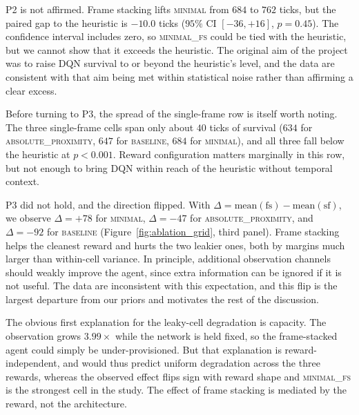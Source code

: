 \documentclass[12pt,a4paper,titlepage]{article}
\begin{document}
P2 is not affirmed. Frame stacking lifts \textsc{minimal} from $684$ to $762$ ticks, but the paired gap to the heuristic is $-10.0$ ticks ($95\%$ CI $[-36, +16]$, $p = 0.45$). The confidence interval includes zero, so \textsc{minimal\_fs} could be tied with the heuristic, but we cannot show that it exceeds the heuristic. The original aim of the project was to raise DQN survival to or beyond the heuristic's level, and the data are consistent with that aim being met within statistical noise rather than affirming a clear excess.

Before turning to P3, the spread of the single-frame row is itself worth noting. The three single-frame cells span only about $40$ ticks of survival ($634$ for \textsc{absolute\_proximity}, $647$ for \textsc{baseline}, $684$ for \textsc{minimal}), and all three fall below the heuristic at $p < 0.001$. Reward configuration matters marginally in this row, but not enough to bring DQN within reach of the heuristic without temporal context.

P3 did not hold, and the direction flipped. With $\Delta = \text{mean}(\text{fs}) - \text{mean}(\text{sf})$, we observe $\Delta = +78$ for \textsc{minimal}, $\Delta = -47$ for \textsc{absolute\_proximity}, and $\Delta = -92$ for \textsc{baseline} (Figure~\ref{fig:ablation_grid}, third panel). Frame stacking helps the cleanest reward and hurts the two leakier ones, both by margins much larger than within-cell variance. In principle, additional observation channels should weakly improve the agent, since extra information can be ignored if it is not useful. The data are inconsistent with this expectation, and this flip is the largest departure from our priors and motivates the rest of the discussion.

The obvious first explanation for the leaky-cell degradation is capacity. The observation grows $3.99\times$ while the network is held fixed, so the frame-stacked agent could simply be under-provisioned. But that explanation is reward-independent, and would thus predict uniform degradation across the three rewards, whereas the observed effect flips sign with reward shape and \textsc{minimal\_fs} is the strongest cell in the study. The effect of frame stacking is mediated by the reward, not the architecture.
\end{document}
